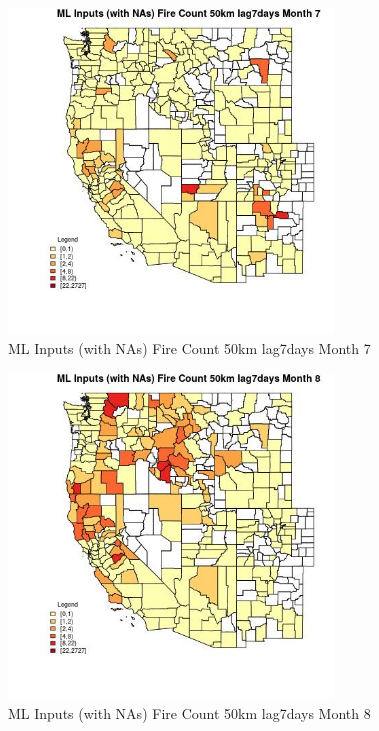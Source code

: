 \begin{figure} 
\centering  
\includegraphics[width=0.77\textwidth]{Code_Outputs/Report_ML_input_PM25_Step4_part_f_de_duplicated_aveswNAs_CountyFire_Count_50km_lag7daysmedianMonth7.jpg} 
\caption{\label{fig:Report_ML_input_PM25_Step4_part_f_de_duplicated_aveswNAsCountyFire_Count_50km_lag7daysmedianMonth7}ML Inputs (with NAs) Fire Count 50km lag7days Month 7} 
\end{figure} 
 

\begin{figure} 
\centering  
\includegraphics[width=0.77\textwidth]{Code_Outputs/Report_ML_input_PM25_Step4_part_f_de_duplicated_aveswNAs_CountyFire_Count_50km_lag7daysmedianMonth8.jpg} 
\caption{\label{fig:Report_ML_input_PM25_Step4_part_f_de_duplicated_aveswNAsCountyFire_Count_50km_lag7daysmedianMonth8}ML Inputs (with NAs) Fire Count 50km lag7days Month 8} 
\end{figure} 
 

